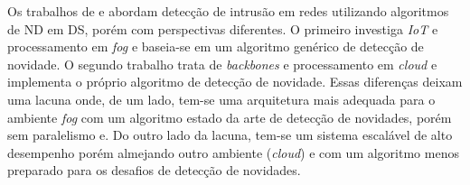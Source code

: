 


Os trabalhos de  e  abordam
detecção de intrusão em redes utilizando algoritmos de ND em DS, porém com
perspectivas diferentes.
O primeiro investiga \emph{IoT} e processamento em \emph{fog} e baseia-se em um
algoritmo genérico de detecção de novidade.
O segundo trabalho trata de \emph{backbones} e processamento em \emph{cloud} e
implementa o próprio algoritmo de detecção de novidade.
Essas diferenças deixam uma lacuna onde, de um lado, tem-se uma
arquitetura mais adequada para o ambiente \emph{fog} com um algoritmo estado da arte de
detecção de novidades, porém sem paralelismo e.
Do outro lado da lacuna, tem-se um sistema
escalável de alto desempenho porém almejando outro ambiente (\emph{cloud}) e
com um algoritmo menos preparado para os desafios de detecção de 
novidades.
% 

